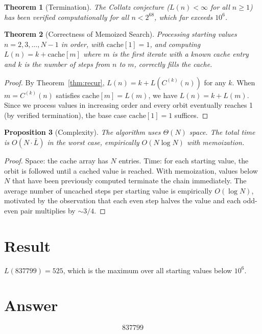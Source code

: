 \documentclass[12pt]{article}
\newtheorem{theorem}{Theorem}
\newtheorem{proposition}[theorem]{Proposition}
\theoremstyle{definition}
\begin{document}
\begin{theorem}[Termination]
The Collatz conjecture ($L(n) < \infty$ for all $n \ge 1$) has been verified computationally for all $n < 2^{68}$, which far exceeds $10^6$.
\end{theorem}

\begin{theorem}[Correctness of Memoized Search]
\label{thm:memo}
Processing starting values $n = 2, 3, \ldots, N-1$ in order, with $\text{cache}[1] = 1$, and computing $L(n) = k + \text{cache}[m]$ where $m$ is the first iterate with a known cache entry and $k$ is the number of steps from $n$ to $m$, correctly fills the cache.
\end{theorem}

\begin{proof}
By Theorem~\ref{thm:recur}, $L(n) = k + L(C^{(k)}(n))$ for any $k$. When $m = C^{(k)}(n)$ satisfies $\text{cache}[m] = L(m)$, we have $L(n) = k + L(m)$. Since we process values in increasing order and every orbit eventually reaches 1 (by verified termination), the base case $\text{cache}[1] = 1$ suffices.
\end{proof}

\begin{proposition}[Complexity]
The algorithm uses $\Theta(N)$ space. The total time is $O(N \cdot \bar{L})$ in the worst case, empirically $O(N \log N)$ with memoization.
\end{proposition}

\begin{proof}
Space: the cache array has $N$ entries. Time: for each starting value, the orbit is followed until a cached value is reached. With memoization, values below $N$ that have been previously computed terminate the chain immediately. The average number of uncached steps per starting value is empirically $O(\log N)$, motivated by the observation that each even step halves the value and each odd-even pair multiplies by $\sim 3/4$.
\end{proof}

\section{Result}

$L(837799) = 525$, which is the maximum over all starting values below $10^6$.

\section{Answer}

\[
\boxed{837799}
\]
\end{document}
